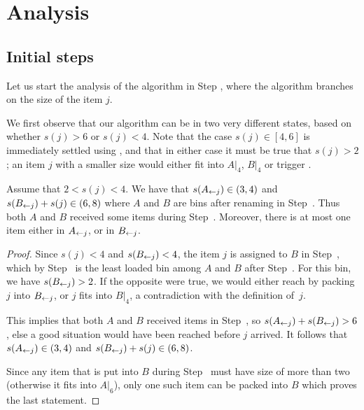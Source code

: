 \section{Analysis}

\subsection{Initial steps}
Let us start the analysis of the algorithm \tbalg in Step
, where the algorithm branches on the size of the item
$j$.

\smallskip
We first observe that our algorithm can be in two very different
states, based on whether $s(j) > 6$ or $s(j) < 4$. Note that the case
$s(j) \in [4,6]$ is immediately settled using , and that in either
case it must be true that $s(j) > 2$; an item $j$ with a smaller size
would either fit into $A|_4$, $B|_4$ or trigger .

\begin{obs}
\label{obs:1a}
Assume that $2 < s(j) <4$. We have that $s(A_{\leftarrow j}) \in (3,4)$
and $s(B_{\leftarrow j}) + s(j) \in(6,8)$
where $A$ and $B$ are bins after renaming in Step~{\rm {}}.
Thus both $A$ and $B$ received some items during Step~{\rm {}}.
Moreover, there is at most one item either in $A_{\leftarrow j}$, or in $B_{\leftarrow j}$.
\end{obs}

\begin{proof}
Since $s(j)<4$ and $s(B_{\leftarrow j})<4$, 
the item $j$ is assigned to $B$ in Step~, which by Step~ is
the least loaded bin among $A$ and $B$ after Step~.
For this bin, we have $s(B_{\leftarrow j}) > 2$. If the opposite were
true, we would either reach  by packing $j$ into $B_{\leftarrow j}$,
or $j$ fits into $B|_4$, a contradiction with the definition of~$j$.

This implies that both $A$ and $B$ received items in Step~, so $s(A_{\leftarrow j})+s(B_{\leftarrow j})>6$,
else a good situation would have been reached before $j$ arrived.
It follows that $s(A_{\leftarrow j})\in(3,4)$ and $s(B_{\leftarrow j}) + s(j) \in (6,8)$.

Since any item that is put into $B$ during Step~ must have size
of more than two (otherwise it fits into $A|_6$), only one such item can be packed into $B$
which proves the last statement.
\end{proof}

